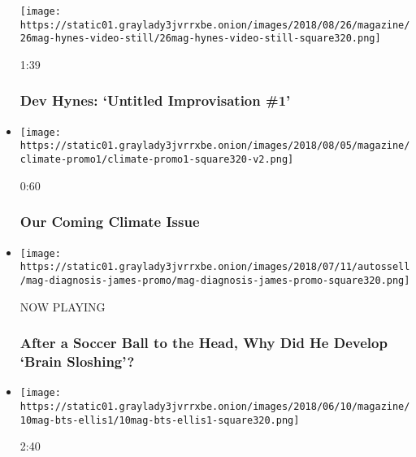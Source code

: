 \begin{itemize}
  \texttt{[image: https://static01.graylady3jvrrxbe.onion/images/2018/08/26/magazine/26mag-hynes-video-still/26mag-hynes-video-still-square320.png]}

  1:39

  \hypertarget{dev-hynes-untitled-improvisation-1}{%
  \subsubsection{Dev Hynes: `Untitled Improvisation
  \#1'}\label{dev-hynes-untitled-improvisation-1}}
\item
  \href{https://www.nytimes3xbfgragh.onion/video/magazine/100000006025347/our-coming-climate-issue.html?action=click\&module=video-series-bar\&region=header\&pgtype=Article\&playlistId=video/magazine}{}

  \texttt{[image: https://static01.graylady3jvrrxbe.onion/images/2018/08/05/magazine/climate-promo1/climate-promo1-square320-v2.png]}

  0:60

  \hypertarget{our-coming-climate-issue}{%
  \subsubsection{Our Coming Climate
  Issue}\label{our-coming-climate-issue}}
\item
  \texttt{[image: https://static01.graylady3jvrrxbe.onion/images/2018/07/11/autossell/mag-diagnosis-james-promo/mag-diagnosis-james-promo-square320.png]}

  NOW PLAYING

  \hypertarget{after-a-soccer-ball-to-the-head-why-did-he-develop-brain-sloshing-2}{%
  \subsubsection{After a Soccer Ball to the Head, Why Did He Develop
  `Brain
  Sloshing'?}\label{after-a-soccer-ball-to-the-head-why-did-he-develop-brain-sloshing-2}}
\item
  \href{https://www.nytimes3xbfgragh.onion/video/magazine/100000005939102/new-york-issue-behind-the-scenes.html?action=click\&module=video-series-bar\&region=header\&pgtype=Article\&playlistId=video/magazine}{}

  \texttt{[image: https://static01.graylady3jvrrxbe.onion/images/2018/06/10/magazine/10mag-bts-ellis1/10mag-bts-ellis1-square320.png]}

  2:40

  \hypertarget{the-making-of-love-city}{%
}
\end{itemize}
